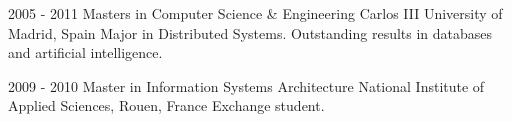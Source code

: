 
\begin{rlist}
  \item 
    \education
      {2005 - 2011}
      {Masters in Computer Science \& Engineering}
      {Carlos III University of Madrid, Spain}
      {Major in Distributed Systems. Outstanding results in databases and artificial intelligence.}
  \item 
    \education
      {2009 - 2010}
      {Master in Information Systems Architecture}
      {National Institute of Applied Sciences, Rouen, France}
      {Exchange student.} 
\end{rlist}


